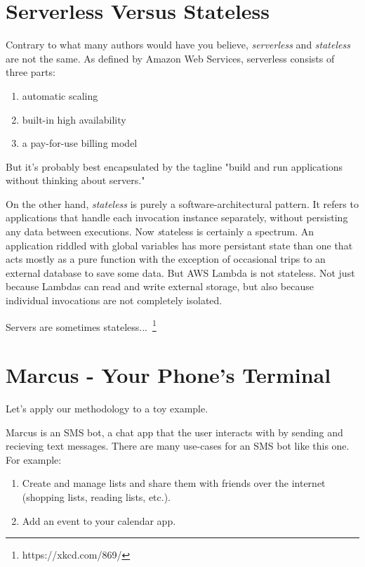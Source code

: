 \documentclass{article}
\newcommand{\term}[1]{\textit{#1}}
\begin{document}
\section{Serverless Versus Stateless}

Contrary to what many authors would have you believe, \term{serverless} and \term{stateless} are not the same.
As defined by Amazon Web Services, serverless consists of three parts:

\begin{enumerate}
    \item automatic scaling
    \item built-in high availability
    \item a pay-for-use billing model
\end{enumerate}

But it's probably best encapsulated by the tagline "build and run applications without thinking about servers."

On the other hand, \textit{stateless} is purely a software-architectural pattern.
It refers to applications that handle each invocation instance separately, without persisting any data between executions.
Now \term stateless is certainly a spectrum.
An application riddled with global variables has more persistant state than one that acts mostly as a pure function with the exception of occasional trips to an external database to save some data.
But AWS Lambda is not stateless.
Not just because Lambdas can read and write external storage, but also because individual invocations are not completely isolated.

Servers are sometimes stateless...~\footnote{https://xkcd.com/869/}

\section{Marcus - Your Phone's Terminal}

Let's apply our methodology to a toy example.

Marcus is an SMS bot, a chat app that the user interacts with by sending and recieving text messages.
There are many use-cases for an SMS bot like this one.
For example:

\begin{enumerate}
  \item Create and manage lists and share them with friends over the internet (shopping lists, reading lists, etc.).
  \item Add an event to your calendar app.
\end{enumerate}
\end{document}
